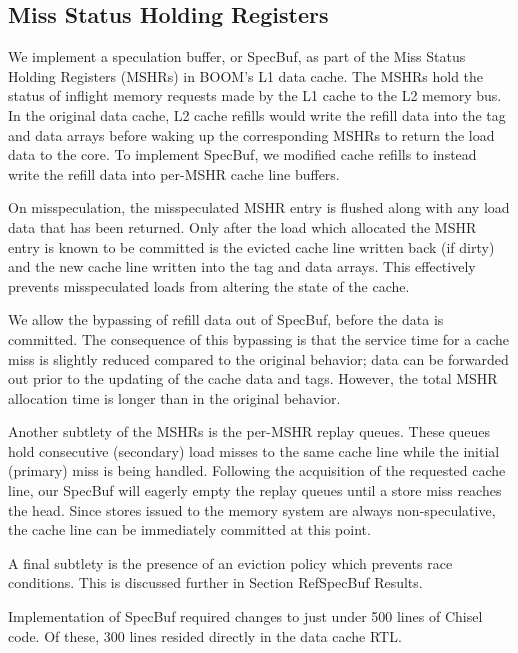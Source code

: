 \subsection{Miss Status Holding Registers}
We implement a speculation buffer, or SpecBuf, as part of the Miss Status Holding Registers (MSHRs) in BOOM's L1 data cache. The MSHRs hold the status of inflight memory requests made by the L1 cache to the L2 memory bus.
In the original data cache, L2 cache refills would write the refill data into the tag and data arrays before waking up the corresponding MSHRs to return the load data to the core.
To implement SpecBuf, we modified cache refills to instead write the refill data into per-MSHR cache line buffers.

On misspeculation, the misspeculated MSHR entry is flushed along with any load data that has been returned. Only after the load which allocated the MSHR entry is known to be committed is the evicted cache line written back (if dirty) and the new cache line written into the tag and data arrays. This effectively prevents misspeculated loads from altering the state of the cache.

We allow the bypassing of refill data out of SpecBuf, before the data is committed. The consequence of this bypassing is that the service time for a cache miss is slightly reduced compared to the original behavior; data can be forwarded out prior to the updating of the cache data and tags. However, the total MSHR allocation time is longer than in the original behavior.

Another subtlety of the MSHRs is the per-MSHR replay queues. These queues hold consecutive (secondary) load misses to the same cache line while the initial (primary) miss is being handled. Following the acquisition of the requested cache line, our SpecBuf will eagerly empty the replay queues until a store miss reaches the head. Since stores issued to the memory system are always non-speculative, the cache line can be immediately committed at this point.

A final subtlety is the presence of an eviction policy which prevents race conditions. This is discussed further in Section Ref{SpecBuf Results}.

Implementation of SpecBuf required changes to just under 500 lines of Chisel code. Of these, 300 lines resided directly in the data cache RTL.

